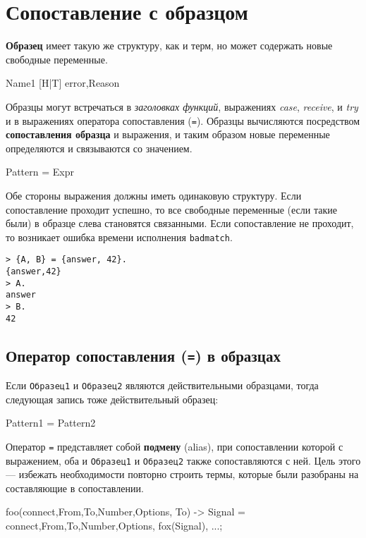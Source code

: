 \section{Сопоставление с образцом}

\textbf{Образец} имеет такую же структуру, как и терм, но может содержать новые
свободные переменные.

\begin{erlang}
Name1
[H|T]
{error,Reason}
\end{erlang}

Образцы могут встречаться в \textit{заголовках функций}, выражениях \textit{case},
\textit{receive}, и \textit{try} и в выражениях оператора сопоставления
(\texttt{=}). Образцы вычисляются посредством \textbf{сопоставления образца} 
и выражения, и таким образом новые переменные определяются и связываются со 
значением.

\begin{erlang}
Pattern = Expr
\end{erlang}

Обе стороны выражения должны иметь одинаковую структуру. Если сопоставление 
проходит успешно, то все свободные переменные (если такие были) в образце слева
становятся связанными. Если сопоставление не проходит, то возникает ошибка
времени исполнения \texttt{badmatch}.


\begin{verbatim}
> {A, B} = {answer, 42}.
{answer,42}
> A.
answer
> B.
42
\end{verbatim}


\subsection{Оператор сопоставления (\texttt{=}) в образцах}

Если \texttt{Образец1} и \texttt{Образец2} являются действительными образцами, тогда следующая запись тоже действительный образец:

\begin{erlang}
Pattern1 = Pattern2
\end{erlang}

Оператор \texttt{=} представляет собой \textbf{подмену} (alias), при сопоставлении
которой с выражением, оба и \texttt{Образец1} и \texttt{Образец2} также 
сопоставляются с ней. Цель этого --- избежать необходимости повторно строить
термы, которые были разобраны на составляющие в сопоставлении.

\begin{erlang}
foo({connect,From,To,Number,Options}, To) ->
    Signal = {connect,From,To,Number,Options},
    fox(Signal),
    ...;
\end{erlang}


